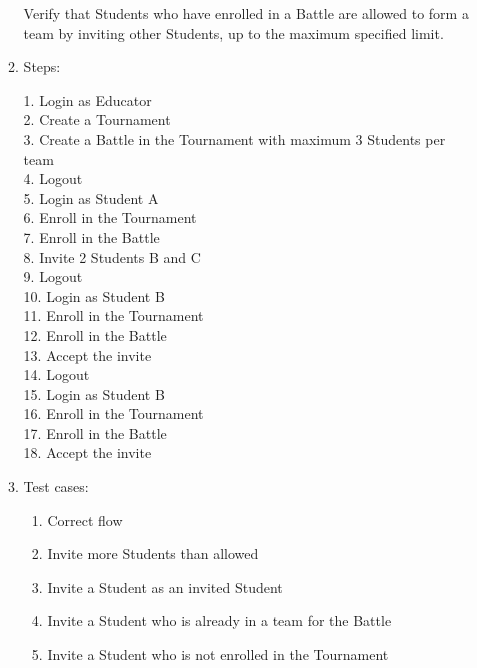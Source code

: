 \documentclass{Configuration_Files/Template}
\begin{document}
\begin{itemize}
\begin{enumerate}
        Verify that Students who have enrolled in a Battle are allowed to form a team by inviting other Students, up to the maximum specified limit.
        
        \item Steps:
        
            1. Login as Educator\\
            2. Create a Tournament\\
            3. Create a Battle in the Tournament with maximum 3 Students per team\\
            4. Logout\\
            5. Login as Student A\\
            6. Enroll in the Tournament\\
            7. Enroll in the Battle\\
            8. Invite 2 Students B and C\\
            9. Logout\\
            10. Login as Student B\\
            11. Enroll in the Tournament\\
            12. Enroll in the Battle\\
            13. Accept the invite\\
            14. Logout\\
            15. Login as Student B\\
            16. Enroll in the Tournament\\
            17. Enroll in the Battle\\
            18. Accept the invite
        
        \item Test cases:
        
        \begin{enumerate}
        
            \item Correct flow
            \item Invite more Students than allowed
            \item Invite a Student as an invited Student
            \item Invite a Student who is already in a team for the Battle
            \item Invite a Student who is not enrolled in the Tournament
    
        \end{enumerate}
        

\end{enumerate}
\end{itemize}
\end{document}
